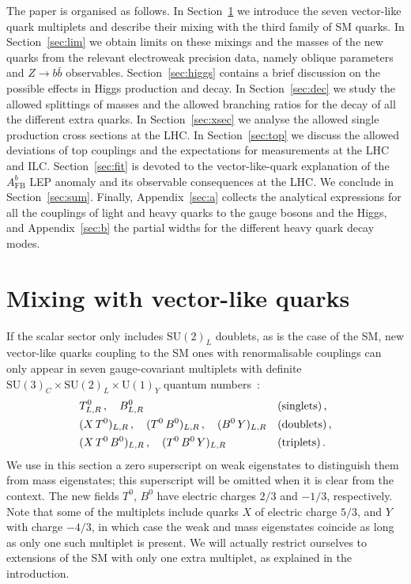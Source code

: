 \documentclass[12pt,a4paper]{article}
\begin{document}
The paper is organised as follows. In Section~\ref{sec:mix} we introduce the seven vector-like quark multiplets and describe their mixing with the third family of SM quarks. In Section~\ref{sec:lim} we obtain limits on these mixings and the masses of the new quarks from the relevant electroweak precision data, namely oblique parameters and $Z\to b\bar{b}$ observables. Section~\ref{sec:higgs} contains a brief discussion on the possible effects in Higgs production and decay. In Section~\ref{sec:dec} we study the allowed splittings of masses and the allowed branching ratios for the decay of all the different extra quarks. In Section~\ref{sec:xsec} we analyse the allowed single production cross sections at the LHC. In Section~\ref{sec:top} we discuss the allowed deviations of top couplings and the expectations for measurements at the LHC and ILC. Section~\ref{sec:fit} is devoted to the vector-like-quark explanation of the $A_\mathrm{FB}^b$ LEP anomaly and its observable consequences at the LHC. We conclude in Section~\ref{sec:sum}. Finally, Appendix~\ref{sec:a} collects the analytical expressions for all the couplings of light and heavy quarks to the gauge bosons and the Higgs, and Appendix~\ref{sec:b} the partial widths for the different heavy quark decay modes.


\section{Mixing with vector-like quarks}
\label{sec:mix}

If the scalar sector only includes $\text{SU}(2)_L$ doublets, as is the case of the SM, new vector-like quarks coupling to the SM ones with renormalisable couplings can only appear in seven gauge-covariant multiplets with definite $\text{SU}(3)_C \times \text{SU}(2)_L \times \text{U}(1)_Y$ quantum numbers~\cite{delAguila:2000aa}:
\begin{align}
& T_{L,R}^0 \,, \quad B_{L,R}^0 && \text{(singlets)} \,, \notag \\
& (X\,T^0)_{L,R} \,, \quad (T^0\,B^0)_{L,R} \,, \quad (B^0\,Y)_{L,R} && \text{(doublets)} \,, \notag \\
& (X\,T^0\,B^0)_{L,R} \,, \quad (T^0\,B^0\,Y)_{L,R}  && \text{(triplets)} \,.
\end{align}
We use in this section a zero superscript on weak eigenstates to distinguish them from mass eigenstates; this superscript will be omitted when it is clear from the context. The new fields $T^0$, $B^0$ have electric charges $2/3$ and $-1/3$, respectively.
Note that some of the multiplets include quarks $X$ of electric charge $5/3$, and $Y$ with charge $-4/3$, in which case the weak and mass eigenstates coincide as long as only one such multiplet is present. We will actually restrict ourselves to extensions of the SM with only one extra multiplet, as explained in the introduction.
\end{document}
